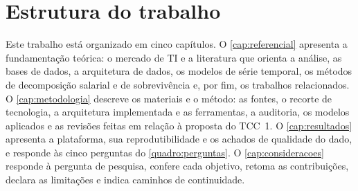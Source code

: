 \section{Estrutura do trabalho}

Este trabalho está organizado em cinco capítulos. O \autoref{cap:referencial} apresenta a fundamentação teórica: o mercado de TI e a literatura que orienta a análise, as bases de dados, a arquitetura de dados, os modelos de série temporal, os métodos de decomposição salarial e de sobrevivência e, por fim, os trabalhos relacionados. O \autoref{cap:metodologia} descreve os materiais e o método: as fontes, o recorte de tecnologia, a arquitetura implementada e as ferramentas, a auditoria, os modelos aplicados e as revisões feitas em relação à proposta do TCC~1. O \autoref{cap:resultados} apresenta a plataforma, sua reprodutibilidade e os achados de qualidade do dado, e responde às cinco perguntas do \autoref{quadro:perguntas}. O \autoref{cap:consideracoes} responde à pergunta de pesquisa, confere cada objetivo, retoma as contribuições, declara as limitações e indica caminhos de continuidade.
